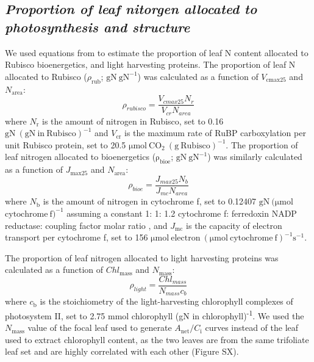     \subsection{\textit{Proportion of leaf nitorgen allocated to photosynthesis and structure}}

    We used equations from  to estimate the proportion of leaf N content allocated to Rubisco bioenergetics, and light harvesting proteins. The proportion of leaf N allocated to Rubisco ($\rho_\mathrm{{rub}}$; $\mathrm{gN\ gN^{-1}}$) was calculated as a function of $V_\mathrm{cmax25}$ and $N_\mathrm{area}$: 
    \begin{equation} \label{eqn_5.6}
        \rho_{rubisco}=\frac{V_{cmax25}N_r}{V_{cr}N_{area}}
    \end{equation}
    \noindent where $N_\mathrm{r}$ is the amount of nitrogen in Rubisco, set to 0.16 $\mathrm{gN\ (gN\ in\ Rubisco)^{-1}}$ and $V_\mathrm{cr}$ is the maximum rate of RuBP carboxylation per unit Rubisco protein, set to 20.5 $\mathrm{\mu mol\ CO_2\ (g\ Rubisco)^{-1}}$. The proportion of leaf nitrogen allocated to bioenergetics ($\mathrm{\rho_{bioe}}$; $\mathrm{gN\ gN^{-1}}$) was similarly calculated as a function of $J_\mathrm{max25}$ and $N_\mathrm{area}$:
    \begin{equation} \label{eqn_5.7}
        \rho_{bioe}=\frac{J_{max25}N_b}{J_{mc}N_{area}}
    \end{equation}
    \noindent where $N_\mathrm{b}$ is the amount of nitrogen in cytochrome f, set to 0.12407 $\mathrm{gN\ (\mu mol}$ $\mathrm{cytochrome\ f)^{-1}}$ assuming a constant 1: 1: 1.2 cytochrome f: ferredoxin NADP reductase: coupling factor molar ratio , and $J_\mathrm{mc}$ is the capacity of electron transport per cytochrome f, set to 156 $\mathrm{\mu mol\ electron\ (\mu mol\ cytochrome\ f)^{-1} s^{-1}}$.

    The proportion of leaf nitrogen allocated to light harvesting proteins was calculated as a function of $Chl_\mathrm{{mass}}$ and $N_\mathrm{{mass}}$:
    \begin{equation} \label{eqn_5.8}
        \rho_{light}=\frac{Chl_{mass}}{N_{mass}c_{b}}
    \end{equation}
    \noindent where $c_\mathrm{{b}}$ is the stoichiometry of the light-harvesting chlorophyll complexes of photosystem II, set to 2.75 mmol chlorophyll (gN in chlorophyll)\textsuperscript{-1}. We used the $N_\mathrm{{mass}}$ value of the focal leaf used to generate $A_\mathrm{{net}}/C_\mathrm{i}$ curves instead of the leaf used to extract chlorophyll content, as the two leaves are from the same trifoliate leaf set and are highly correlated with each other (Figure SX).

